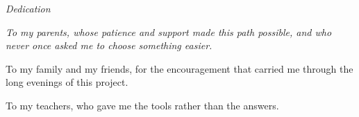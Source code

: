 \thispagestyle{empty}
\begin{center}
  {\Large\itshape Dedication}
\end{center}
\vspace{1.2cm}

\begin{center}
\begin{minipage}{0.78\textwidth}
\itshape
To my parents, whose patience and support made this path possible, and who
never once asked me to choose something easier.

\vspace{0.7cm}

To my family and my friends, for the encouragement that carried me through
the long evenings of this project.

\vspace{0.7cm}

To my teachers, who gave me the tools rather than the answers.
\end{minipage}
\end{center}

\begin{flushright}
  \textit{\authorname}
\end{flushright}
\clearpage
